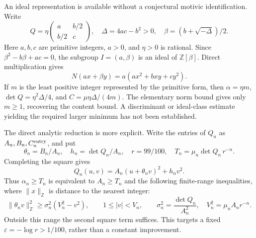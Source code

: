 \documentclass[11pt]{article}
\theoremstyle{remark}
\newcommand{\Z}{\mathbb Z}
\begin{document}
An ideal representation is available without a conjectural motivic
identification. Write
\[
 Q=\eta\begin{pmatrix}a&b/2\\b/2&c\end{pmatrix},\quad
 \Delta=4ac-b^2>0,\quad \beta=(b+\sqrt{-\Delta})/2.
\]
Here \(a,b,c\) are primitive integers, \(a>0\), and \(\eta>0\) is
rational. Since \(\beta^2-b\beta+ac=0\), the subgroup
\(I=(a,\beta)\) is an ideal of \(\Z[\beta]\). Direct multiplication gives
\[
 N(ax+\beta y)=a(ax^2+bxy+cy^2).
\]
If \(m\) is the least positive integer represented by the primitive form,
then \(\alpha=\eta m\), \(\det Q=\eta^2\Delta/4\), and
\(C=\mu\eta\Delta/(4m)\). The elementary norm bound gives only
\(m\ge1\), recovering the content bound. A discriminant or ideal-class
estimate yielding the required larger minimum has not been established.

The direct analytic reduction is more explicit. Write the entries of
\(Q_n\) as \(A_n,B_n,C_n^{\rm entry}\), and put
\[
 \theta_n=B_n/A_n,\quad h_n=\det Q_n/A_n,\quad
 r=99/100,\quad T_n=\mu_n\det Q_n\,r^{-n}.
\]
Completing the square gives
\[
 Q_n(u,v)=A_n(u+\theta_nv)^2+h_nv^2.
\]
Thus \(\alpha_n\ge T_n\) is equivalent to \(A_n\ge T_n\) and the
following finite-range inequalities, where \(\|x\|_{\Z}\) is distance
to the nearest integer:
\begin{equation}
 \|\theta_nv\|_{\Z}^2\ge\sigma_n^2(V_n^2-v^2),\qquad
 1\le |v|<V_n,\qquad
 \sigma_n^2=\frac{\det Q_n}{A_n^2},\quad
 V_n^2=\mu_nA_n r^{-n}.
 \label{eq:schur-full-range}
\end{equation}
Outside this range the second square term suffices. This targets a fixed
\(\varepsilon=-\log r>1/100\), rather than a constant improvement.
\end{document}
